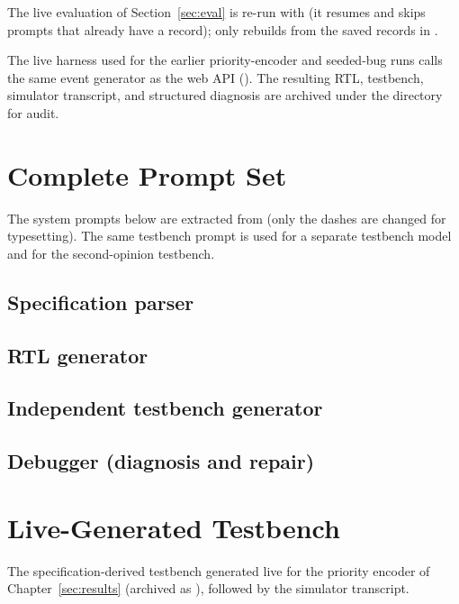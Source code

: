 The live evaluation of Section~\ref{sec:eval} is re-run with
 (it resumes and skips prompts that already
have a record);  only rebuilds  from the
saved records in .

The live harness used for the earlier priority-encoder and seeded-bug runs calls
the same event generator as the web API (). The resulting RTL,
testbench, simulator transcript, and structured diagnosis are archived under
the directory  for audit.


\chapter{Complete Prompt Set}
\label{app:prompts}
The system prompts below are extracted from  (only the dashes are changed for typesetting). The same testbench prompt is used for a separate testbench model and for the second-opinion testbench.
\lstset{basicstyle=\ttfamily\tiny,language=,breaklines=true,frame=single}
\section{Specification parser}

\section{RTL generator}

\section{Independent testbench generator}

\section{Debugger (diagnosis and repair)}


\chapter{Live-Generated Testbench}
\label{app:tb}
The specification-derived testbench generated live for the priority encoder of Chapter~\ref{sec:results} (archived as ), followed by the simulator transcript.



